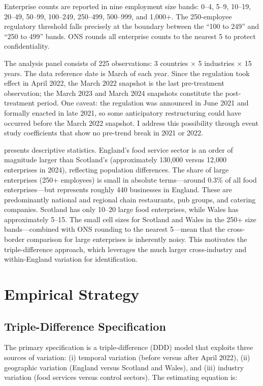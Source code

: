 \documentclass[12pt]{article}
\begin{document}
Enterprise counts are reported in nine employment size bands: 0--4, 5--9, 10--19, 20--49, 50--99, 100--249, 250--499, 500--999, and 1,000+. The 250-employee regulatory threshold falls precisely at the boundary between the ``100 to 249'' and ``250 to 499'' bands. ONS rounds all enterprise counts to the nearest 5 to protect confidentiality.

The analysis panel consists of 225 observations: 3 countries $\times$ 5 industries $\times$ 15 years. The data reference date is March of each year. Since the regulation took effect in April 2022, the March 2022 snapshot is the last pre-treatment observation; the March 2023 and March 2024 snapshots constitute the post-treatment period. One caveat: the regulation was announced in June 2021 and formally enacted in late 2021, so some anticipatory restructuring could have occurred before the March 2022 snapshot. I address this possibility through event study coefficients that show no pre-trend break in 2021 or 2022.

 presents descriptive statistics. England's food service sector is an order of magnitude larger than Scotland's (approximately 130,000 versus 12,000 enterprises in 2024), reflecting population differences. The share of large enterprises (250+ employees) is small in absolute terms---around 0.3\% of all food enterprises---but represents roughly 440 businesses in England. These are predominantly national and regional chain restaurants, pub groups, and catering companies. Scotland has only 10--20 large food enterprises, while Wales has approximately 5--15. The small cell sizes for Scotland and Wales in the 250+ size bands---combined with ONS rounding to the nearest 5---mean that the cross-border comparison for large enterprises is inherently noisy. This motivates the triple-difference approach, which leverages the much larger cross-industry and within-England variation for identification.




\section{Empirical Strategy}
\label{sec:strategy}

\subsection{Triple-Difference Specification}

The primary specification is a triple-difference (DDD) model that exploits three sources of variation: (i) temporal variation (before versus after April 2022), (ii) geographic variation (England versus Scotland and Wales), and (iii) industry variation (food services versus control sectors). The estimating equation is:
\end{document}
